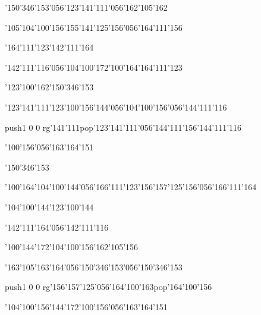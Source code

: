 \null\vfill\ipa\centerline{\enskip\char'150\char'346\char'153\char'056\char'123\char'141\char'111\char'056\char'162\char'105\char'162}\medskip\centerline{\enskip\enskip\enskip\enskip\char'105\enskip\char'104\char'100\char'156\enskip\enskip\enskip\enskip\enskip\char'155\char'141\char'125\char'156\char'056\char'164\char'111\char'156}\medskip\centerline{\enskip\char'164\char'111\char'123\enskip\enskip\enskip\enskip\enskip\enskip\enskip\enskip\enskip\enskip\char'142\char'111\char'164}\medskip\centerline{\enskip\char'142\char'111\char'116\char'056\char'104\char'100\char'172\enskip\char'100\char'164\enskip\enskip\enskip\char'164\char'111\char'123}\medskip\centerline{\enskip\enskip\enskip\enskip\enskip\enskip\enskip\char'123\char'100\char'162\enskip\char'150\char'346\char'153}\medskip\centerline{\enskip\char'123\char'141\char'111\enskip\char'123\char'100\char'156\char'144\char'056\char'104\char'100\char'156\char'056\char'144\char'111\char'116}\medskip\centerline{\enskip\pdfcolorstack\match push{1 0 0 rg}\char'141\char'111\pdfcolorstack\match pop{}\enskip\char'123\char'141\char'111\char'056\char'144\char'111\char'156\enskip\char'144\char'111\char'116}\medskip\centerline{\enskip\enskip\enskip\enskip\enskip\enskip\enskip\enskip\enskip\enskip\enskip\enskip\enskip\enskip\char'100\char'156\char'056\char'163\char'164\char'151}\medskip\vfill\footline{\hfil\tt\folio\hfil}\eject
\null\vfill\ipa\centerline{\enskip\char'150\char'346\char'153\enskip\enskip\enskip\enskip\enskip\enskip\enskip}\medskip\centerline{\enskip\char'100\char'164\enskip\enskip\enskip\char'104\char'100\char'144\char'056\char'166\char'111\char'123\enskip\char'156\char'157\char'125\char'156\char'056\char'166\char'111\char'164}\medskip\centerline{\enskip\char'104\char'100\char'144\enskip\enskip\enskip\enskip\enskip\enskip\enskip\enskip\enskip\enskip\char'123\char'100\char'144}\medskip\centerline{\enskip\char'142\char'111\char'164\char'056\char'142\char'111\char'116\enskip\enskip\enskip\enskip\enskip\enskip\enskip\enskip\enskip}\medskip\centerline{\enskip\char'100\char'144\char'172\enskip\enskip\enskip\char'104\char'100\char'156\enskip\char'162\char'105\char'156}\medskip\centerline{\enskip\enskip\enskip\enskip\enskip\char'163\char'105\char'163\char'164\char'056\char'150\char'346\char'153\char'056\char'150\char'346\char'153}\medskip\centerline{\enskip\enskip\enskip\enskip\pdfcolorstack\match push{1 0 0 rg}\char'156\char'157\char'125\char'056\char'164\char'100\char'163\pdfcolorstack\match pop{}\enskip\char'164\char'100\char'156}\medskip\centerline{\enskip\enskip\enskip\enskip\enskip\char'104\char'100\char'156\char'144\char'172\enskip\enskip\enskip\enskip\char'100\char'156\char'056\char'163\char'164\char'151}\medskip\vfill\footline{\hfil\tt\folio\hfil}\eject
